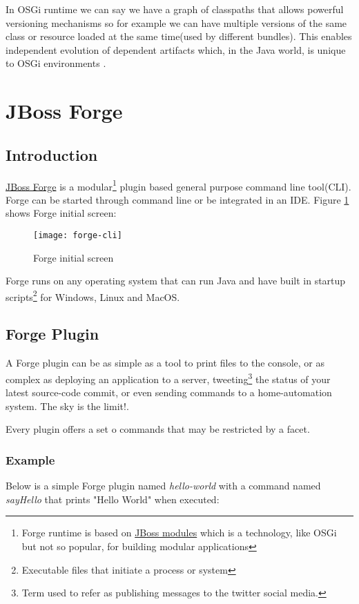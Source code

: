 In OSGi runtime we can say we have a graph of classpaths that allows powerful versioning mechanisms so for example we can have multiple versions of the same class or resource loaded at the same time(used by different bundles). This enables independent evolution of dependent artifacts which, in the Java world, is unique to OSGi environments \citep{semantic versioning 2010}.   

\section{JBoss Forge}
\label{sec:forge}
\subsection{Introduction}
\href{http://forge.jboss.org/1.x/}{JBoss Forge} is a modular\footnote{Forge runtime is based on \href{https://docs.jboss.org/author/display/MODULES/Introduction}{JBoss modules} which is a technology, like OSGi but not so popular, for building modular applications} plugin based general purpose command line tool(CLI). Forge can be started through command line or be integrated in an IDE. Figure \ref{forge-cli} shows Forge initial screen:

\begin{figure}[h]
\caption{Forge initial screen}
\label{forge-cli}
\centering
\texttt{[image: forge-cli]}
\end{figure}  
\FloatBarrier

Forge runs on any operating system that can run Java and have built in startup scripts\footnote{Executable files that initiate a process or system} for Windows, Linux and MacOS.

\subsection{Forge Plugin}
\label{sec:forge:plugin}
A Forge plugin can be as simple as a tool to print files to the console, or as complex as deploying an application to a server, tweeting\footnote{Term used to refer as publishing messages to the twitter social media.} the status of your latest source-code commit, or even sending commands to a home-automation system. The sky is the limit!. 

Every plugin offers a set o commands that may be restricted by a facet.

\subsubsection{Example}
Below is a simple Forge plugin named \emph{hello-world} with a command named \emph{sayHello} that prints "Hello World" when executed:

